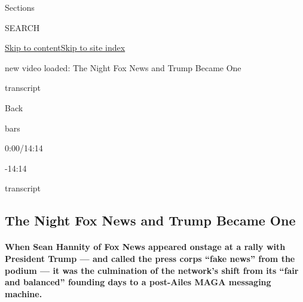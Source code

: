 Sections

SEARCH

\protect\hyperlink{site-content}{Skip to
content}\protect\hyperlink{site-index}{Skip to site index}

new video loaded: The Night Fox News and Trump Became One

transcript

Back

bars

0:00/14:14

-14:14

transcript

\hypertarget{the-night-fox-news-and-trump-became-one}{%
\subsection{The Night Fox News and Trump Became
One}\label{the-night-fox-news-and-trump-became-one}}

\hypertarget{when-sean-hannity-of-fox-news-appeared-onstage-at-a-rally-with-president-trump--and-called-the-press-corps-fake-news-from-the-podium--it-was-the-culmination-of-the-networks-shift-from-its-fair-and-balanced-founding-days-to-a-post-ailes-maga-messaging-machine}{%
\paragraph{When Sean Hannity of Fox News appeared onstage at a rally
with President Trump --- and called the press corps ``fake news'' from
the podium --- it was the culmination of the network's shift from its
``fair and balanced'' founding days to a post-Ailes MAGA messaging
machine.}\label{when-sean-hannity-of-fox-news-appeared-onstage-at-a-rally-with-president-trump--and-called-the-press-corps-fake-news-from-the-podium--it-was-the-culmination-of-the-networks-shift-from-its-fair-and-balanced-founding-days-to-a-post-ailes-maga-messaging-machine}}

